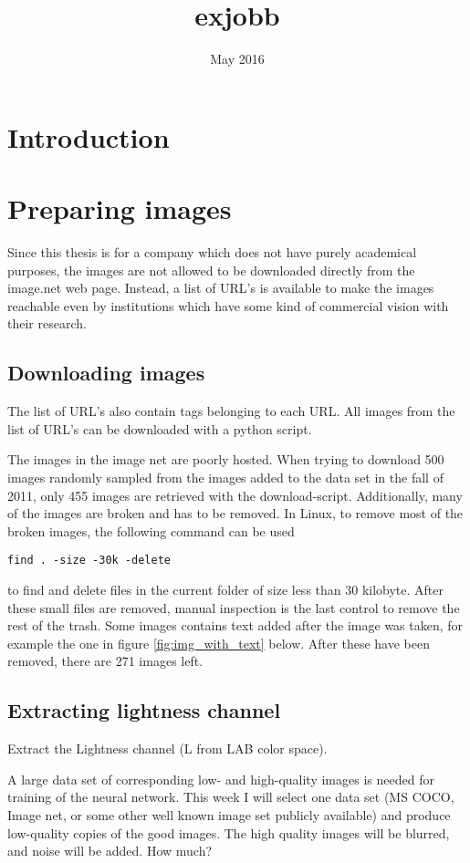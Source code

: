 \documentclass{article}
\title{exjobb}
\author{ }
\date{May 2016}
\begin{document}
\maketitle

\section{Introduction}
\section{Preparing images}
Since this thesis is for a company which does not have purely academical purposes, the images are not allowed to be downloaded directly from the image.net web page. Instead, a list of URL's is available to make the images reachable even by institutions which have some kind of commercial vision with their research.

\subsection{Downloading images}
The list of URL's also contain tags belonging to each URL. All images from the list of URL's can be downloaded with a python script.

The images in the image net are poorly hosted. When trying to download 500 images randomly sampled from the images added to the data set in the fall of 2011, only 455 images are retrieved with the download-script. Additionally, many of the images are broken and has to be removed. In Linux, to remove most of the broken images, the following command can be used 
\begin{lstlisting}
find . -size -30k -delete
\end{lstlisting} to find and delete files in the current folder of size less than 30 kilobyte. After these small files are removed, manual inspection is the last control to remove the rest of the trash. Some images contains text added after the image was taken, for example the one in figure \ref{fig:img_with_text} below.
After these have been removed, there are 271 images left.

\subsection{Extracting lightness channel}
Extract the Lightness channel (L from LAB color space). 



A large data set of corresponding low- and high-quality images is needed for training of the neural network. This week I will select one data set (MS COCO, Image net, or some other well known image set publicly available) and produce low-quality copies of the good images. The high quality images will be blurred, and noise will be added. How much? 
\end{document}
